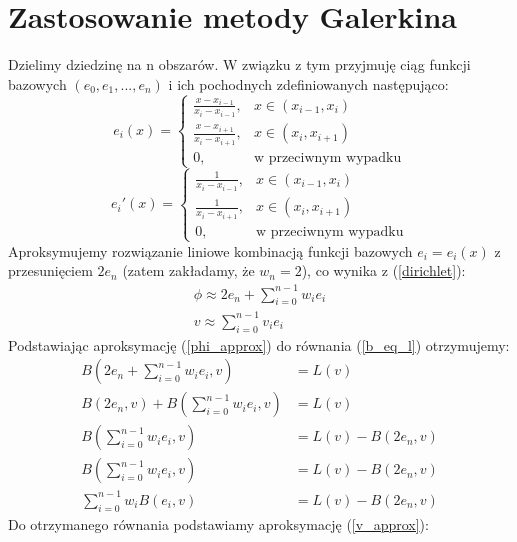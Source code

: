\documentclass[a4paper,12pt]{article}
\begin{document}
    \section{Zastosowanie metody Galerkina}
    Dzielimy dziedzinę na n obszarów.
    W związku z tym przyjmuję ciąg funkcji bazowych \((e_0, e_1, ..., e_n)\) i ich pochodnych zdefiniowanych następująco:
    \begin{equation}
        e_i(x) =
        \begin{cases}
            \frac{x-x_{i-1}}{x_i-x_{i-1}},& x \in (x_{i-1}, x_i) \\
            \frac{x-x_{i+1}}{x_i-x_{i+1}},& x \in (x_i, x_{i+1}) \\
            0,& \text{w przeciwnym wypadku}
        \end{cases} \label{e_def}
    \end{equation}
    \begin{equation}
        e_i'(x) =
        \begin{cases}
            \frac{1}{x_i-x_{i-1}},& x \in (x_{i-1}, x_i) \\
            \frac{1}{x_i-x_{i+1}},& x \in (x_i, x_{i+1}) \\
            0,& \text{w przeciwnym wypadku}
        \end{cases} \label{eprime_def}
    \end{equation}
    Aproksymujemy rozwiązanie liniowe kombinacją funkcji bazowych \(e_i = e_i(x)\) z przesunięciem \(2e_n\) (zatem zakładamy, że \(w_n = 2\)), co wynika z (\ref{dirichlet}):
    \begin{gather}
        \phi \approx 2e_n + \sum_{i=0}^{n-1} w_i e_i \label{phi_approx}\\
        v \approx \sum_{i=0}^{n-1} v_i e_i \label{v_approx}
    \end{gather}
    Podstawiając aproksymację (\ref{phi_approx}) do równania (\ref{b_eq_l}) otrzymujemy:
    \begin{align*}
        B\left(2e_n + \sum_{i=0}^{n-1} w_i e_i, v\right) &= L(v) \\
        B(2e_n, v) + B\left(\sum_{i=0}^{n-1} w_i e_i, v\right) &= L(v) \\
        B\left(\sum_{i=0}^{n-1} w_i e_i, v\right) &= L(v)-B(2e_n, v) \\
        B\left(\sum_{i=0}^{n-1} w_i e_i, v\right) &= L(v)-B(2e_n, v) \\
        \sum_{i=0}^{n-1} w_i B(e_i, v) &= L(v)-B(2e_n, v)
    \end{align*}
    Do otrzymanego równania podstawiamy aproksymację (\ref{v_approx}):
\end{document}
